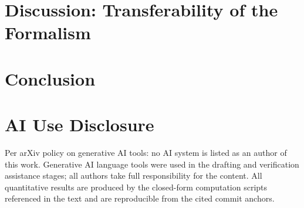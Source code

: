 \documentclass[11pt]{article}
\begin{document}
\section{Discussion: Transferability of the Formalism}

\section{Conclusion}

\section*{AI Use Disclosure}
Per arXiv policy on generative AI tools: no AI system is listed as an author
of this work. Generative AI language tools were used in the drafting and
verification assistance stages; all authors take full responsibility for the
content. All quantitative results are produced by the closed-form computation
scripts referenced in the text and are reproducible from the cited commit
anchors.
\end{document}
